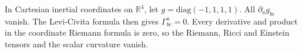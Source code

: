 In Cartesian inertial coordinates on \(\mathbb R^4\), let
\(g=\mathrm{diag}(-1,1,1,1)\). All \(\partial_a g_{bc}\) vanish.
The Levi-Civita formula then gives \(\Gamma^a_{bc}=0\).
Every derivative and product in the coordinate Riemann formula is zero,
so the Riemann, Ricci and Einstein tensors and the scalar curvature vanish.
